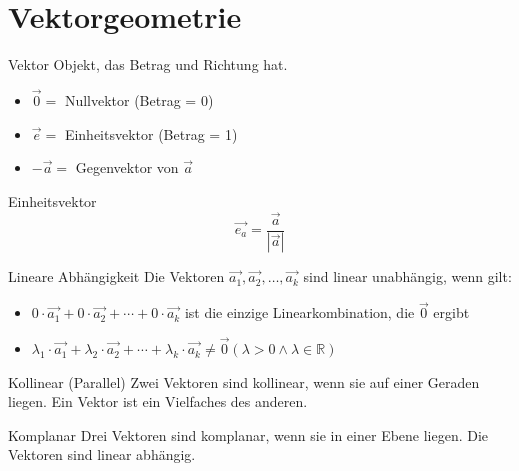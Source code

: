 \graphicspath{{images/}}

\section{Vektorgeometrie}

\begin{definition}{Vektor}
    Objekt, das Betrag und Richtung hat.
    \begin{itemize}
        \item $\overrightarrow{0} = $ Nullvektor (Betrag = 0)
        \item $\overrightarrow{e} = $ Einheitsvektor (Betrag = 1)
        \item $-\overrightarrow{a} = $ Gegenvektor von $\overrightarrow{a}$
    \end{itemize}
\end{definition}

\begin{concept}{Einheitsvektor}
    $$\overrightarrow{e_a} = \frac{\overrightarrow{a}}{|\overrightarrow{a}|}$$  
\end{concept}

\begin{definition}{Lineare Abhängigkeit}
    Die Vektoren $\overrightarrow{a_{1}}, \overrightarrow{a_{2}}, \ldots, \overrightarrow{a_{k}}$ sind linear unabhängig, wenn gilt:
    \vspace*{2mm}
    \begin{itemize}
    \item $0 \cdot \overrightarrow{a_{1}}+0 \cdot \overrightarrow{a_{2}}+\cdots+0 \cdot \overrightarrow{a_{k}}$ ist die einzige Linearkombination, die $\overrightarrow{0}$ ergibt
    \item $\lambda_{1} \cdot \overrightarrow{a_{1}}+\lambda_{2} \cdot \overrightarrow{a_{2}}+\cdots+\lambda_{k} \cdot \overrightarrow{a_{k}} \neq \overrightarrow{0}(\lambda>0 \wedge \lambda \in \mathbb{R})$
    \end{itemize}
\end{definition}

\begin{definition}{Kollinear (Parallel)}
    Zwei Vektoren sind kollinear, wenn sie auf einer Geraden liegen. Ein Vektor ist ein Vielfaches des anderen.
\end{definition}

\begin{definition}{Komplanar}
    Drei Vektoren sind komplanar, wenn sie in einer Ebene liegen. Die Vektoren sind linear abhängig.
\end{definition}

